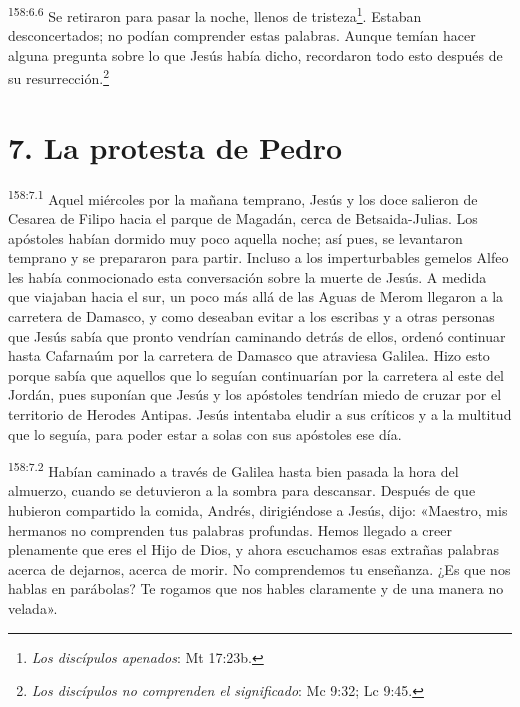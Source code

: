 {\par 
\textsuperscript{158:6.6} Se retiraron para pasar la noche, llenos de tristeza\footnote{\textit{Los discípulos apenados}: Mt 17:23b.}. Estaban desconcertados; no podían comprender estas palabras. Aunque temían hacer alguna pregunta sobre lo que Jesús había dicho, recordaron todo esto después de su resurrección.\footnote{\textit{Los discípulos no comprenden el significado}: Mc 9:32; Lc 9:45.}

\section*{7. La protesta de Pedro}
\par 
\textsuperscript{158:7.1} Aquel miércoles por la mañana temprano, Jesús y los doce salieron de Cesarea de Filipo hacia el parque de Magadán, cerca de Betsaida-Julias. Los apóstoles habían dormido muy poco aquella noche; así pues, se levantaron temprano y se prepararon para partir. Incluso a los imperturbables gemelos Alfeo les había conmocionado esta conversación sobre la muerte de Jesús. A medida que viajaban hacia el sur, un poco más allá de las Aguas de Merom llegaron a la carretera de Damasco, y como deseaban evitar a los escribas y a otras personas que Jesús sabía que pronto vendrían caminando detrás de ellos, ordenó continuar hasta Cafarnaúm por la carretera de Damasco que atraviesa Galilea. Hizo esto porque sabía que aquellos que lo seguían continuarían por la carretera al este del Jordán, pues suponían que Jesús y los apóstoles tendrían miedo de cruzar por el territorio de Herodes Antipas. Jesús intentaba eludir a sus críticos y a la multitud que lo seguía, para poder estar a solas con sus apóstoles ese día.

\par 
\textsuperscript{158:7.2} Habían caminado a través de Galilea hasta bien pasada la hora del almuerzo, cuando se detuvieron a la sombra para descansar. Después de que hubieron compartido la comida, Andrés, dirigiéndose a Jesús, dijo: «Maestro, mis hermanos no comprenden tus palabras profundas. Hemos llegado a creer plenamente que eres el Hijo de Dios, y ahora escuchamos esas extrañas palabras acerca de dejarnos, acerca de morir. No comprendemos tu enseñanza. ¿Es que nos hablas en parábolas? Te rogamos que nos hables claramente y de una manera no velada».

}
